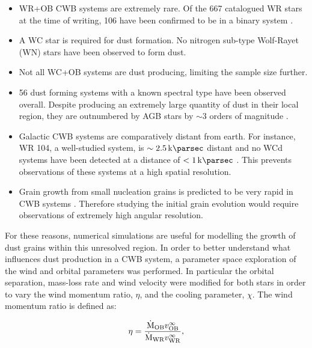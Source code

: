 \documentclass[fleqn,usenatbib]{mnras}
\begin{document}
\begin{itemize}
  \item WR+OB CWB systems are extremely rare. Of the 667 catalogued WR stars at the time of writing, 106 have been confirmed to be in a binary system \citep{rossloweSpatialDistributionGalactic2015,williamsVariableDustEmission2019}.
  \item A WC star is required for dust formation. No nitrogen sub-type Wolf-Rayet (WN) stars have been observed to form dust.
  \item Not all WC+OB systems are dust producing, limiting the sample size further.
  \item 56 dust forming systems with a known spectral type have been observed overall. Despite producing an extremely large quantity of dust in their local region, they are outnumbered by AGB stars by $\sim 3$ orders of magnitude \citep{ishiharaGalacticDistributionsCarbon2011}.
  \item Galactic CWB systems are comparatively distant from earth. For instance, WR 104, a well-studied system, is $\sim \SI{2.5}{\kilo\parsec}$ distant \citep{soulainSPHEREViewWolfRayet2018} and no WCd systems have been detected at a distance of $< 1 \, \si{\kilo\parsec}$ \citep{rossloweSpatialDistributionGalactic2015}. This prevents observations of these systems at a high spatial resolution.
  \item Grain growth from small nucleation grains is predicted to be very rapid in CWB systems \citep{zubkoPhysicalModelDust1998a}. Therefore studying the initial grain evolution would require observations of extremely high angular resolution.
\end{itemize}

For these reasons, numerical simulations are useful for modelling the growth of dust grains within this unresolved region.
In order to better understand what influences dust production in a CWB system, a parameter space exploration of the wind and orbital parameters was performed.
In particular the orbital separation, mass-loss rate and wind velocity were modified for both stars in order to vary the wind momentum ratio, $\eta$, and the cooling parameter, $\chi$.
The wind momentum ratio is defined as:

\begin{equation}
  \label{eq:paper1-eta}
  \eta = \frac{\dot{\text M}_\text{OB} v^\infty_\text{OB}}{\dot{\text M}_\text{WR}v^\infty_\text{WR}} ,
\end{equation}
\end{document}
